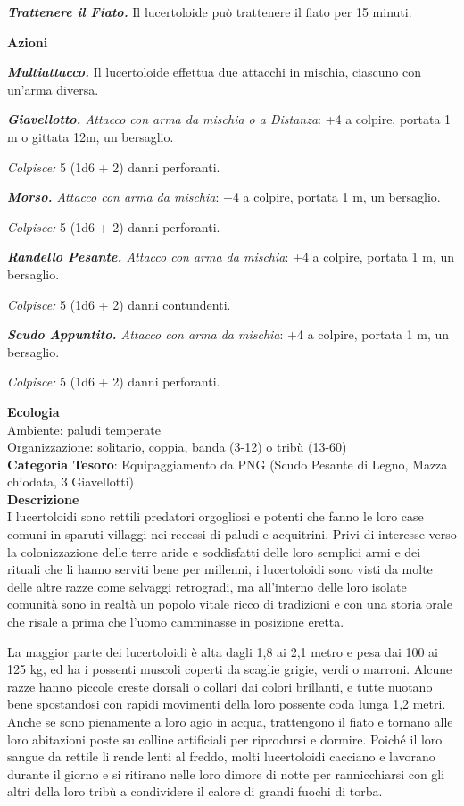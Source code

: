 \begin{multicols}{2}
{\emph{\textbf{Trattenere il Fiato.}} Il lucertoloide può trattenere il fiato per 15 minuti.

\textbf{Azioni}

\emph{\textbf{Multiattacco.}} Il lucertoloide effettua due attacchi in mischia, ciascuno con un'arma diversa.

\emph{\textbf{Giavellotto.} Attacco con arma da mischia o a Distanza}: +4 a colpire, portata 1 m o gittata 12m, un bersaglio.

\emph{Colpisce:} 5 (1d6 + 2) danni perforanti.

\emph{\textbf{Morso.} Attacco con arma da mischia}: +4 a colpire, portata 1 m, un bersaglio.

\emph{Colpisce:} 5 (1d6 + 2) danni perforanti.

\emph{\textbf{Randello Pesante.} Attacco con arma da mischia}: +4 a colpire, portata 1 m, un bersaglio.

\emph{Colpisce:} 5 (1d6 + 2) danni contundenti.

\emph{\textbf{Scudo Appuntito.} Attacco con arma da mischia}: +4 a colpire, portata 1 m, un bersaglio.

\emph{Colpisce:} 5 (1d6 + 2) danni perforanti.

\textbf{Ecologia}\\
Ambiente: paludi temperate\\
Organizzazione: solitario, coppia, banda (3-12) o tribù (13-60)\\
\textbf{Categoria Tesoro}: Equipaggiamento da PNG (Scudo Pesante di Legno, Mazza chiodata, 3 Giavellotti)\\

\textbf{Descrizione}\\
I lucertoloidi sono rettili predatori orgogliosi e potenti che fanno le loro case comuni in sparuti villaggi nei recessi di paludi e acquitrini. Privi di interesse verso la colonizzazione delle terre aride e soddisfatti delle loro semplici armi e dei rituali che li hanno serviti bene per millenni, i lucertoloidi sono visti da molte delle altre razze come selvaggi retrogradi, ma all'interno delle loro isolate comunità sono in realtà un popolo vitale ricco di tradizioni e con una storia orale che risale a prima che l'uomo camminasse in posizione eretta.

La maggior parte dei lucertoloidi è alta dagli 1,8 ai 2,1 metro e pesa dai 100 ai 125 kg, ed ha i possenti muscoli coperti da scaglie grigie, verdi o marroni. Alcune razze hanno piccole creste dorsali o collari dai colori brillanti, e tutte nuotano bene spostandosi con rapidi movimenti della loro possente coda lunga 1,2 metri. Anche se sono pienamente a loro agio in acqua, trattengono il fiato e tornano alle loro abitazioni poste su colline artificiali per riprodursi e dormire. Poiché il loro sangue da rettile li rende lenti al freddo, molti lucertoloidi cacciano e lavorano durante il giorno e si ritirano nelle loro dimore di notte per rannicchiarsi con gli altri della loro tribù a condividere il calore di grandi fuochi di torba.

}
\end{multicols}
